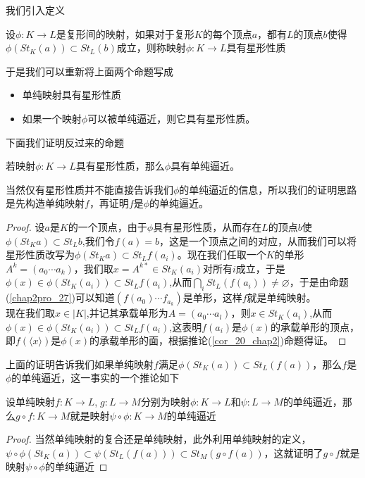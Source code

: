 我们引入定义
\begin{definition}
设$\phi:K\rightarrow L$是复形间的映射，如果对于复形$K$的每个顶点$a$，都有$L$的顶点$b$使得$\phi(St_{K}(a))\subset St_{L}(b)$成立，则称映射$\phi:K\rightarrow L$具有星形性质
\end{definition}
于是我们可以重新将上面两个命题写成
\begin{proposition}
\begin{itemize}
    \item 单纯映射具有星形性质
    \item 如果一个映射$\phi$可以被单纯逼近，则它具有星形性质。
\end{itemize}
\end{proposition}
下面我们证明反过来的命题
\begin{proposition}\label{pro_2_64}
若映射$\phi:K\rightarrow L$具有星形性质，那么$\phi$具有单纯逼近。
\end{proposition}
当然仅有星形性质并不能直接告诉我们$\phi$的单纯逼近的信息，所以我们的证明思路是先构造单纯映射$f$，再证明$f$是$\phi$的单纯逼近。
\begin{proof}
设$a$是$K$的一个顶点，由于$\phi$具有星形性质，从而存在$L$的顶点$b$使$\phi(St_{K}a)\subset St_{L}b$,我们令$f(a)=b$，这是一个顶点之间的对应，从而我们可以将星形性质改写为$\phi(St_{K}a)\subset St_{L}f(a_{i})$。现在我们任取一个$K$的单形$A^{k}=(a_{0}\cdots a_{k})$，我们取$x=A^{k*}\in St_{K}(a_{i})$对所有$i$成立，于是$\phi(x)\in\phi(St_{K}(a_{i}))\subset St_{L}f(a_{i})$,从而$\bigcap\limits_{i}St_{L}(f(a_{i}))\neq \varnothing$，于是由命题(\ref{chap2pro_27})可以知道$(f(a_{0})\cdots f_{a_{k}})$是单形，这样$f$就是单纯映射。\\
现在我们取$x\in |K|$,并记其承载单形为$A=(a_{0}\cdots a_{l})$，则$x\in St_{K}(a_{i})$,从而$\phi(x)\in\phi(St_{K}(a_{i}))\subset St_{L}f(a_{i})$,这表明$f(a_{i})$是$\phi(x)$的承载单形的顶点，即$f(\langle x\rangle)$是$\phi(x)$的承载单形的面，根据推论(\ref{cor_20_chap2})命题得证。
\end{proof}
上面的证明告诉我们如果单纯映射$f$满足$\phi(St_{K}(a))\subset St_{L}(f(a))$，那么$f$是$\phi$的单纯逼近，这一事实的一个推论如下
\begin{corollary}\label{cor_2_73}
设单纯映射$f:K\rightarrow L$,$\;g:L\rightarrow M$分别为映射$\phi:K\rightarrow L$和$\psi:L\rightarrow M$的单纯逼近，那么$g\circ f:K\rightarrow M$就是映射$\psi\circ\phi:K\rightarrow M$的单纯逼近
\end{corollary}
\begin{proof}
当然单纯映射的复合还是单纯映射，此外利用单纯映射的定义，$\psi\circ\phi(St_{K}(a))\subset \psi(St_{L}(f(a)))\subset St_{M}(g\circ f(a))$，这就证明了$g\circ f$就是映射$\psi\circ\phi$的单纯逼近
\end{proof}
